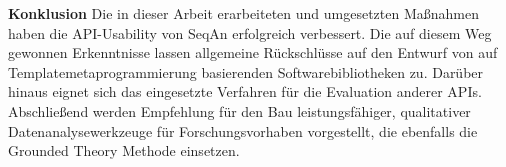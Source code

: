 \documentclass[11pt, twoside]{Thesis}  %
\begin{document}
{\textbf{Konklusion} Die in dieser Arbeit erarbeiteten und umgesetzten Maßnahmen haben die API-Usability von SeqAn erfolgreich verbessert. Die auf diesem Weg gewonnen Erkenntnisse lassen allgemeine Rückschlüsse auf den Entwurf von auf Templatemetaprogrammierung basierenden Softwarebibliotheken zu. Darüber hinaus eignet sich das eingesetzte Verfahren für die Evaluation anderer APIs. Abschließend werden Empfehlung für den Bau leistungsfähiger, qualitativer Datenanalysewerkzeuge für Forschungsvorhaben vorgestellt, die ebenfalls die Grounded Theory Methode einsetzen.



  







}

\cleardoublepage  %

\end{document}
